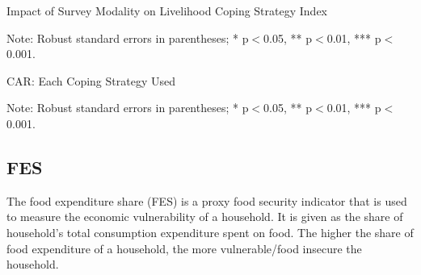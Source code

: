 \documentclass[11pt,harvard]{article}
\begin{document}
	
	\begin{table}[htbp]
		\centering
		\begin{adjustbox}{max width=\textwidth}
			\begin{threeparttable}
				\caption{Impact of Survey Modality on Livelihood Coping Strategy Index}
				\scriptsize
				 
				\label{tab:LCS_Modality_CAR}
				\begin{tablenotes}
					\item Note: Robust standard errors in parentheses; * p$<$0.05, ** p$<$0.01, *** p$<$0.001. 
				\end{tablenotes}
			\end{threeparttable}
		\end{adjustbox}
	\end{table}




	\begin{table}[htbp]
		\centering
		\begin{adjustbox}{max width=\textwidth}
			\begin{threeparttable}
				\caption{CAR: Each Coping Strategy Used}
				\scriptsize
				 
				\label{tab:LCS_Ind_Modality_CAR}
				\begin{tablenotes}
					\item Note: Robust standard errors in parentheses; * p$<$0.05, ** p$<$0.01, *** p$<$0.001. 
				\end{tablenotes}
			\end{threeparttable}
		\end{adjustbox}
	\end{table}
	
	
	\pagebreak
	
	
	
	
	\subsection{FES}
	
	The food expenditure share (FES) is a proxy food security indicator that is used to measure the economic vulnerability of a household. It is given as the share of household's total consumption expenditure spent on food. The higher the share of food expenditure of a household, the more vulnerable/food insecure the household.
	
\end{document}
